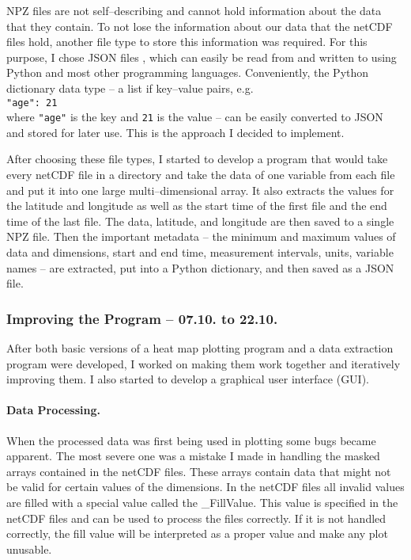 \documentclass[../00_main.tex]{subfiles}
\begin{document}
NPZ files are not self--describing and cannot hold information about the data 
that they contain. To not lose the information about our data that the netCDF 
files hold, another file type to store this information was required. For this 
purpose, I chose JSON files \cite{json}, which can easily be read from and 
written to using Python and most other programming languages. Conveniently,
the Python dictionary data type \cite{py-dict} -- a list if key--value pairs, 
e.g.\\
\texttt{"age": 21} \\
\noindent
where \texttt{"age"} is the key and \texttt{21} is the value -- can be easily
converted to JSON and stored for later use. This is the approach I decided to
implement.\newline

After choosing these file types, I started to develop a program that would
take every netCDF file in a directory and take the data of one variable from
each file and put it into one large multi--dimensional array. It also extracts
the values for the latitude and longitude as well as the start time of the
first file and the end time of the last file. The data, latitude, and longitude
are then saved to a single NPZ file. Then the important metadata -- the minimum
and maximum values of data and dimensions, start and end time, measurement
intervals, units, variable names -- are extracted, put into a Python
dictionary, and then saved as a JSON file.

\subsubsection{Improving the Program -- 07.10. to 22.10.}

After both basic versions of a heat map plotting program and a data extraction
program were developed, I worked on making them work together and iteratively 
improving them. I also started to develop a graphical user interface (GUI).

\paragraph{Data Processing.}

When the processed data was first being used in plotting some bugs became
apparent. The most severe one was a mistake I made in handling the masked
arrays contained in the netCDF files. These arrays contain data that might not
be valid for certain values of the dimensions. In the netCDF files all invalid
values are filled with a special value called the \_FillValue. This value is 
specified in the netCDF files and can be used to process the files correctly. 
If it is not handled correctly, the fill value will be interpreted as a proper 
value and make any plot unusable.\newline
\end{document}
